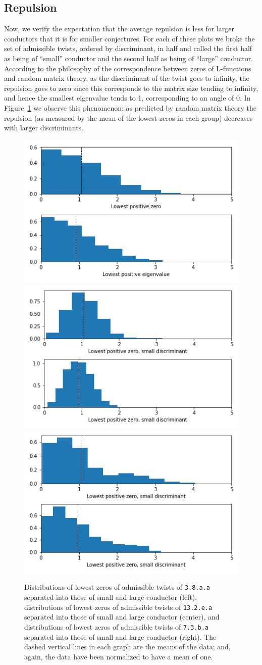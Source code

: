 \documentclass[11pt]{amsart}
\begin{document}
\subsection{Repulsion} Now, we verify the expectation that the average repulsion is less for larger conductors that it is for smaller conjectures. For each of these plots we broke the set of admissible twists, ordered by discriminant, in half and called the first half as being of ``small'' conductor and the second half as being of ``large'' conductor.  According to the philosophy of the correspondence between zeros of L-functions and random matrix theory, as the discriminant of the twist goes to infinity, the repulsion goes to zero since this corresponds to the matrix size tending to infinity, and hence the smallest eigenvalue tends to 1, corresponding to an angle of 0.  In Figure~\ref{fig:repulsion} we observe this phenomenon: as predicted by random matrix theory the repulsion (as measured by the mean of the lowest zeros in each group) decreases with larger discriminants.
\begin{figure}
\includegraphics[width=.3\textwidth]{images/exp1-lo-hi.png}\hfill
\includegraphics[width=.3\textwidth]{images/exp2-lo-hi.png}\hfill
\includegraphics[width=.3\textwidth]{images/exp3-lo-hi.png}\\
\caption{Distributions of lowest zeros of admissible twists of \texttt{3.8.a.a} separated into those of small and large conductor (left), distributions of lowest zeros of admissible twists of \texttt{13.2.e.a} separated into those of small and large conductor (center), and distributions of lowest zeros of admissible twists of \texttt{7.3.b.a} separated into those of small and large conductor (right).  The dashed vertical lines in each graph are the means of the data; and, again, the data have been normalized to have a mean of one.}\label{fig:repulsion}
\end{figure}
\end{document}
